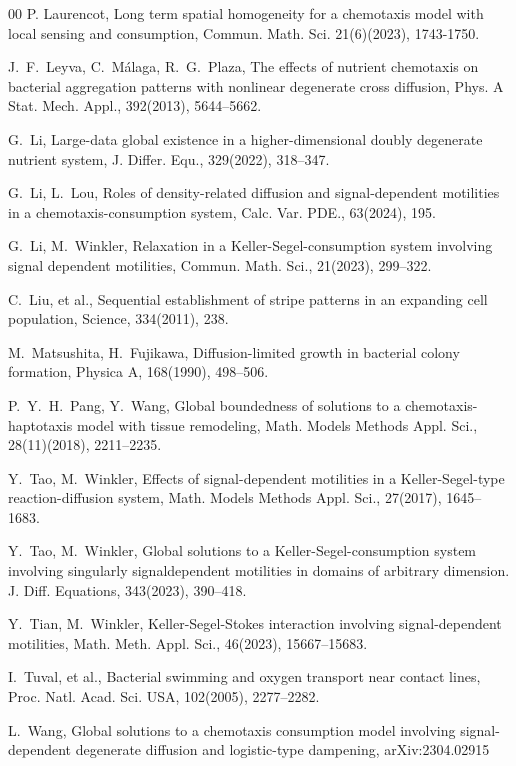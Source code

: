 \documentclass[12pt]{article}
\theoremstyle{plain}
\theoremstyle{definition}
\numberwithin{equation}{section}
\begin{document}
\begin{thebibliography}{00}
P. Laurencot,  Long term spatial homogeneity for a chemotaxis model with local sensing and consumption,
Commun. Math. Sci. 21(6)(2023), 1743-1750.

J.~F.~Leyva, C.~M\'{a}laga, R.~G.~Plaza, The effects of nutrient chemotaxis on bacterial aggregation patterns with nonlinear degenerate cross diffusion, Phys. A Stat. Mech. Appl., 392(2013), 5644--5662.

G.~Li, Large-data global existence in a higher-dimensional doubly degenerate nutrient system, J. Differ.
Equ., 329(2022), 318--347.

G.~Li, L.~Lou,  Roles of density-related diffusion and signal-dependent motilities in a chemotaxis-consumption system,  Calc. Var. PDE., 63(2024), 195.

G.~Li, M.~Winkler, Relaxation in a Keller-Segel-consumption system involving signal dependent motilities,
 Commun. Math. Sci., 21(2023),  299--322.

C.~Liu, et al.,
 Sequential establishment of stripe patterns in an expanding cell population, Science, 334(2011), 238.

M.~Matsushita, H.~Fujikawa, Diffusion-limited growth in bacterial colony formation, Physica A, 168(1990), 498--506.

 P.~Y.~H.~Pang, Y.~Wang,
  Global boundedness of solutions to a chemotaxis-haptotaxis model with tissue remodeling, Math. Models  Methods  Appl. Sci., 28(11)(2018), 2211--2235.

Y.~Tao, M.~Winkler, Effects of signal-dependent motilities in a Keller-Segel-type reaction-diffusion system, Math.
Models Methods Appl. Sci., 27(2017), 1645--1683.

Y.~Tao, M.~Winkler,
 Global solutions to a Keller-Segel-consumption system involving singularly signaldependent motilities in domains of arbitrary dimension. J. Diff. Equations, 343(2023), 390--418.

 Y.~Tian, M.~Winkler,
 Keller-Segel-Stokes interaction involving signal-dependent motilities,   Math. Meth. Appl. Sci., 46(2023), 15667--15683.

 I.~Tuval, et al.,
  Bacterial swimming and oxygen transport near contact
lines, Proc. Natl. Acad. Sci. USA, 102(2005), 2277--2282.

L.~Wang, Global solutions to a chemotaxis consumption model involving signal-dependent degenerate diffusion and logistic-type dampening,  arXiv:2304.02915


\end{thebibliography}
\end{document}
